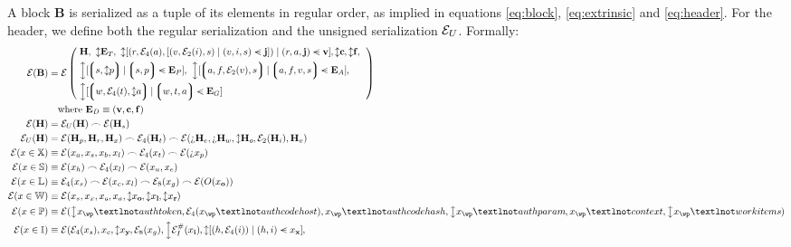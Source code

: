 A block $\mathbf{B}$ is serialized as a tuple of its elements in regular order, as implied in equations \ref{eq:block}, \ref{eq:extrinsic} and \ref{eq:header}. For the header, we define both the regular serialization and the unsigned serialization $\mathcal{E}_U$. Formally:
\begin{align}
  \se(\mathbf{B}) &= \se\,\left\lparen\;\begin{aligned}
    &\mathbf{H},\ 
    \var{\xttickets},\ 
    \var{[(r, \se_4(a), [(v, \se_2(i), s) \mid (v, i, s) \orderedin \mathbf{j}]) \mid (r, a, \mathbf{j}) \orderedin \mathbf{v}]}, \var{\mathbf{c}}, \var{\mathbf{f}},\ \\
    &\var{[\tup{s, \var{p}} \mid \tup{s, p} \orderedin \xtpreimages]},\ 
    \var{[\tup{a, f, \se_2(v), s} \mid \tup{a, f, v, s} \orderedin \xtassurances]},\ \\
    &\var{[\tup{w, \se_4(t), \var{a}} \mid \tup{w, t, a} \orderedin \xtguarantees]}
  \end{aligned}\;\right\rparen \\
  \nonumber &\quad \where \xtdisputes \equiv (\mathbf{v}, \mathbf{c}, \mathbf{f}) \\
  \se(\mathbf{H}) &= \se_U(\mathbf{H})\concat\se(\mathbf{H}_s) \\
  \se_U(\mathbf{H}) &= \se(\mathbf{H}_p,\mathbf{H}_r,\mathbf{H}_x)\concat\se_4(\mathbf{H}_t)\concat\se(\maybe{\mathbf{H}_e},\maybe{\mathbf{H}_w},\var{\mathbf{H}_o},\se_2(\mathbf{H}_i),\mathbf{H}_v)\\
  \se(x \in \mathbb{X}) &\equiv \se(x_a, x_s, x_b, x_l)\concat\se_4(x_t)\concat\se(\maybe{x_p})\\
  \se(x \in \mathbb{S}) &\equiv \se(x_h) \concat \se_4(x_l)\concat\se(x_u, x_e) \\
  \se(x \in \mathbb{L}) &\equiv \se_4(x_s)\concat\se(x_c, x_l)\concat\se_8(x_g)\concat\se(O(x_\mathbf{o}))\\
  \se(x \in \mathbb{W}) &\equiv \se(x_s, x_x, x_c, x_a, \var{x_\mathbf{o}}, \var{x_\mathbf{l}}, \var{x_\mathbf{r}}) \\
  \se(x \in \mathbb{P}) &\equiv \se(\var{x_\wp¬authtoken}, \se_4(x_\wp¬authcodehost), x_\wp¬authcodehash, \var{x_\wp¬authparam}, x_\wp¬context, \var{x_\wp¬workitems}) \\
  \se(x \in \mathbb{I}) &\equiv \se(
    \se_4(x_s),
    x_c,
    \var{x_\mathbf{y}},
    \se_8(x_g),
    \var{\se_I^\#(x_\mathbf{i})},
    \var{\sq{(h, \se_4(i)) \mid (h, i) \orderedin x_\mathbf{x}}},

\end{align}
